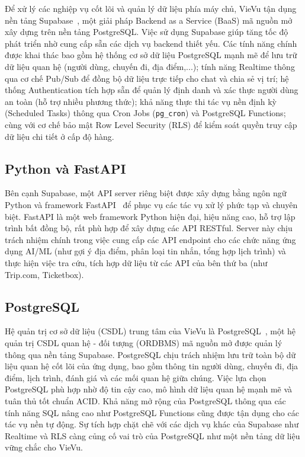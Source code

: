Để xử lý các nghiệp vụ cốt lõi và quản lý dữ liệu phía máy chủ, VieVu tận dụng nền tảng Supabase~\cite{supabase_doc}, một giải pháp Backend as a Service (BaaS) mã nguồn mở xây dựng trên nền tảng PostgreSQL. Việc sử dụng Supabase giúp tăng tốc độ phát triển nhờ cung cấp sẵn các dịch vụ backend thiết yếu. Các tính năng chính được khai thác bao gồm hệ thống cơ sở dữ liệu PostgreSQL mạnh mẽ để lưu trữ dữ liệu quan hệ (người dùng, chuyến đi, địa điểm,...); tính năng Realtime thông qua cơ chế Pub/Sub để đồng bộ dữ liệu trực tiếp cho chat và chia sẻ vị trí; hệ thống Authentication tích hợp sẵn để quản lý định danh và xác thực người dùng an toàn (hỗ trợ nhiều phương thức); khả năng thực thi tác vụ nền định kỳ (Scheduled Tasks) thông qua Cron Jobs (\texttt{pg\_cron}) và PostgreSQL Functions; cùng với cơ chế bảo mật Row Level Security (RLS) để kiểm soát quyền truy cập dữ liệu chi tiết ở cấp độ hàng.

\subsection{Python và FastAPI} %
\label{subsec:backend_fastapi}

Bên cạnh Supabase, một API server riêng biệt được xây dựng bằng ngôn ngữ Python và framework FastAPI~\cite{fastapi_doc} để phục vụ các tác vụ xử lý phức tạp và chuyên biệt. FastAPI là một web framework Python hiện đại, hiệu năng cao, hỗ trợ lập trình bất đồng bộ, rất phù hợp để xây dựng các API RESTful. Server này chịu trách nhiệm chính trong việc cung cấp các API endpoint cho các chức năng ứng dụng AI/ML (như gợi ý địa điểm, phân loại tin nhắn, tổng hợp lịch trình) và thực hiện việc tra cứu, tích hợp dữ liệu từ các API của bên thứ ba (như Trip.com, Ticketbox).

\subsection{PostgreSQL} %
\label{subsec:database_postgres} %

Hệ quản trị cơ sở dữ liệu (CSDL) trung tâm của VieVu là PostgreSQL~\cite{postgresql_doc}, một hệ quản trị CSDL quan hệ - đối tượng (ORDBMS) mã nguồn mở được quản lý thông qua nền tảng Supabase. PostgreSQL chịu trách nhiệm lưu trữ toàn bộ dữ liệu quan hệ cốt lõi của ứng dụng, bao gồm thông tin người dùng, chuyến đi, địa điểm, lịch trình, đánh giá và các mối quan hệ giữa chúng. Việc lựa chọn PostgreSQL phù hợp nhờ độ tin cậy cao, mô hình dữ liệu quan hệ mạnh mẽ và tuân thủ tốt chuẩn ACID. Khả năng mở rộng của PostgreSQL thông qua các tính năng SQL nâng cao như PostgreSQL Functions cũng được tận dụng cho các tác vụ nền tự động. Sự tích hợp chặt chẽ với các dịch vụ khác của Supabase như Realtime và RLS càng củng cố vai trò của PostgreSQL như một nền tảng dữ liệu vững chắc cho VieVu.
